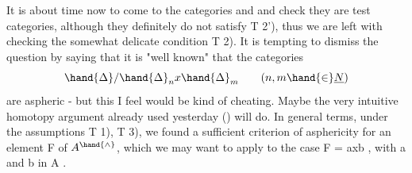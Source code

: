 It is about time now to come to the categories \hand{$\Delta$} and \hand{$\square$} and check
they are test categories, although they definitely do not satisfy T 2'),
thus we are left with checking the somewhat delicate condition T 2). It
is tempting to dismiss the question by saying that it is "well known" that
the categories
\[ \hand{\Delta} / \hand{\Delta}_n x \hand{\Delta}_m \qquad (n,m \hand{\in} \underline{N} ) \]
are aspheric - but this I feel would be kind of cheating. Maybe the
very intuitive homotopy argument already used yesterday ()
will do. In general terms, under the assumptions T 1), T 3), we found
a sufficient criterion of asphericity for an element F of $A^{\hand{\wedge}}$, which we
may want to apply to the case F = axb , with a and b in A . 
